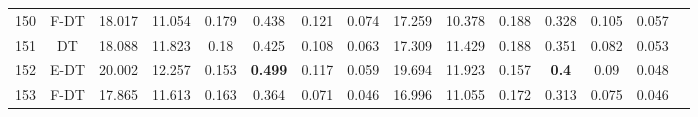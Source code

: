 \begin{longtable}{@{\hskip3pt}c@{\hskip3pt}c@{\hskip3pt}c@{\hskip3pt}c@{\hskip3pt}c@{\hskip3pt}c@{\hskip3pt}c@{\hskip3pt}c@{\hskip3pt}c@{\hskip3pt}c@{\hskip3pt}c@{\hskip3pt}c@{\hskip3pt}c@{\hskip3pt}c@{\hskip3pt}c}
        150 &           F-DT &            18.017 &      11.054 &           0.179 &           0.438 &           0.121 &           0.074 &              17.259 &      10.378 &           0.188 &         0.328 &          0.105 &           0.057 \\
        151 &             DT &            18.088 &      11.823 &            0.18 &           0.425 &           0.108 &           0.063 &              17.309 &      11.429 &           0.188 &         0.351 &          0.082 &           0.053 \\
        152 &           E-DT &            20.002 &      12.257 &           0.153 &  \textbf{0.499} &           0.117 &           0.059 &              19.694 &      11.923 &           0.157 &  \textbf{0.4} &           0.09 &           0.048 \\
        153 &           F-DT &            17.865 &      11.613 &           0.163 &           0.364 &           0.071 &           0.046 &              16.996 &      11.055 &           0.172 &         0.313 &          0.075 &           0.046 \\
\end{longtable}
